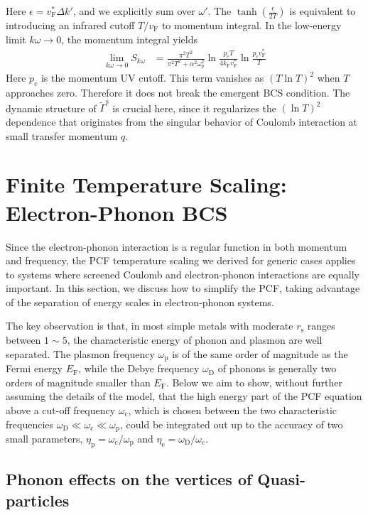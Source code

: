 \documentclass[%
 reprint,
superscriptaddress,
 amsmath,amssymb,
 aps,
prx,
]{revtex4-2}
\newcommand{\Gammapp}{\tilde{\Gamma}}
\newcommand{\txc}{\text{c}}
\newcommand{\txe}{\text{e}}
\newcommand{\txp}{\text{p}}
\newcommand{\txs}{\text{s}}
\newcommand{\txD}{\text{D}}
\newcommand{\txF}{\text{F}}
\begin{document}
\begin{appendices}
Here $\epsilon = v_\txF^{*} \Delta k'$, and we explicitly sum over $\omega'$. The $\tanh(\frac{\epsilon}{2T})$ is equivalent to introducing an infrared cutoff $T/v_\txF$ to momentum integral. In the low-energy limit $k\omega\rightarrow0$, the momentum integral yields
\begin{align}
\lim\limits_{k\omega\rightarrow 0} S_{k\omega} &=\frac{\pi ^2T^2}{\pi^2T^2+\alpha^2\omega_{p}^2}\ln \frac{p_{\txc} T}{4 k_\txF v_\txF^*}\ln \frac{p_{\txc} v_\txF^*}{T} \nonumber
\end{align}
Here $p_{\txc}$ is the momentum UV cutoff. This term vanishes as $(T \ln T)^2$ when $T$ approaches zero. Therefore it does not break the emergent BCS  condition. The dynamic structure of $\Gammapp^\txs$ is crucial here, since it regularizes the $(\ln T)^2$ dependence that originates from the singular behavior of Coulomb interaction at small transfer momentum $q$. 

\section{Finite Temperature Scaling: Electron-Phonon BCS}
\label{app:eliashberg}

Since the electron-phonon interaction is a regular function in both momentum and frequency, the PCF temperature scaling we derived for generic cases applies to systems where screened Coulomb and electron-phonon interactions are equally important.
In this section, we discuss how to simplify the PCF, taking advantage of the separation of energy scales in electron-phonon systems.


The key observation is that, in most simple metals with moderate  $r_\txs$ ranges between $1\sim 5$, the characteristic energy of phonon and plasmon are well separated. The plasmon frequency $\omega_\txp$ is
of the same order of magnitude as the Fermi energy $E_\txF$, while the Debye frequency $\omega_\txD$ of
phonons is generally two orders of magnitude smaller than $E_\txF$.
Below we aim to show, without further assuming the details of the model, that
the high energy part of the PCF equation above a cut-off frequency $\omega_\txc$,
which is chosen between the two characteristic frequencies $\omega_\txD \ll
\omega_\txc \ll \omega_\txp$,
could be integrated out up to the accuracy of two small parameters,
$\eta_\txp=\omega_\txc/\omega_\txp$ and $\eta_\txe=\omega_\txD/\omega_\txc$. 

\subsection{Phonon effects on the vertices of Quasi-particles}


\end{appendices}
\end{document}
